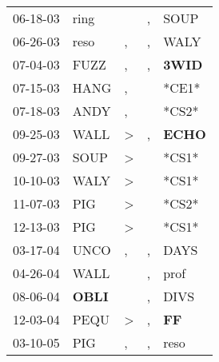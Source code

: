 \begin{supertabular}{p{0.07\textwidth}p{0.06\textwidth}p{0.02\textwidth}p{0.02\textwidth}p{0.06\textwidth}}
 06-18-03\textsuperscript{} &           ring\textsuperscript{} &                  &             , &           SOUP\textsuperscript{} \\
 06-26-03\textsuperscript{} &           reso\textsuperscript{} &                , &             , &           WALY\textsuperscript{} \\
 07-04-03\textsuperscript{} &           FUZZ\textsuperscript{} &                , &             , &  \textbf{3WID\textsuperscript{}} \\
 07-15-03\textsuperscript{} &           HANG\textsuperscript{} &                , &               &                            *CE1* \\
 07-18-03\textsuperscript{} &           ANDY\textsuperscript{} &                , &               &                            *CS2* \\
 09-25-03\textsuperscript{} &           WALL\textsuperscript{} &     \textgreater &             , &  \textbf{ECHO\textsuperscript{}} \\
 09-27-03\textsuperscript{} &           SOUP\textsuperscript{} &     \textgreater &               &                            *CS1* \\
 10-10-03\textsuperscript{} &           WALY\textsuperscript{} &     \textgreater &               &                            *CS1* \\
 11-07-03\textsuperscript{} &            PIG\textsuperscript{} &     \textgreater &               &                            *CS2* \\
 12-13-03\textsuperscript{} &            PIG\textsuperscript{} &     \textgreater &               &                            *CS1* \\
 03-17-04\textsuperscript{} &           UNCO\textsuperscript{} &                , &             , &           DAYS\textsuperscript{} \\
 04-26-04\textsuperscript{} &           WALL\textsuperscript{} &                  &             , &           prof\textsuperscript{} \\
 08-06-04\textsuperscript{} &  \textbf{OBLI\textsuperscript{}} &                  &             , &           DIVS\textsuperscript{} \\
 12-03-04\textsuperscript{} &           PEQU\textsuperscript{} &     \textgreater &             , &    \textbf{FF\textsuperscript{}} \\
 03-10-05\textsuperscript{} &            PIG\textsuperscript{} &                , &             , &           reso\textsuperscript{} \\

\end{supertabular}
